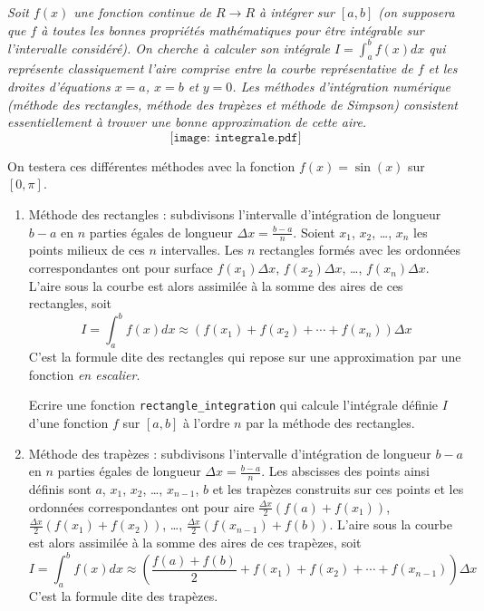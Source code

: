 \begin{td}\label{td:integration}
\em
Soit $f(x)$ une fonction continue de $R \rightarrow R$ à intégrer sur $[a,b]$ 
(on supposera que $f$ à toutes les bonnes propriétés mathématiques pour être
intégrable sur l'intervalle considéré). On cherche à calculer son intégrale
$\displaystyle I = \int_a^b f(x)dx$ qui représente classiquement l'aire
comprise entre la courbe représentative de $f$ et les droites d'équations 
$x=a$, $x=b$ et $y=0$. Les méthodes d'intégration numérique (méthode des rectangles, 
méthode des trapèzes et méthode de Simpson) consistent 
essentiellement à trouver une bonne approximation de cette aire.
$$\texttt{[image: integrale.pdf]}$$

On testera ces différentes méthodes avec la fonction $f(x) = \sin(x)$ sur $[0,\pi]$.
\begin{enumerate}
\item Méthode des rectangles : subdivisons l'intervalle d'intégration de
	longueur $b-a$ en $n$ parties égales de longueur 
	$\displaystyle\Delta x = \frac{b-a}{n}$. Soient $x_1$, $x_2$, \ldots,
	$x_n$ les points milieux de ces $n$ intervalles. Les $n$ rectangles
	formés avec les ordonnées correspondantes ont pour surface $f(x_1)\Delta
	x$, $f(x_2)\Delta x$, \ldots, $f(x_n)\Delta x$. L'aire sous la courbe 
	est alors assimilée à la somme des aires de ces rectangles, soit 
	$$\displaystyle I = \int_a^b f(x)dx \approx
	\left(f(x_1)+f(x_2)+\cdots+f(x_n)\right)\Delta x$$ 
	C'est la formule dite
	des rectangles qui repose sur une approximation par une fonction {\em en
	escalier}.
	
	Ecrire une fonction {\tt rectangle\_integration} qui calcule l'intégrale définie $I$ d'une fonction 
	$f$ sur $[a,b]$ à l'ordre $n$ par la méthode des rectangles.
	
\item Méthode des trapèzes : subdivisons l'intervalle d'intégration de
	longueur $b-a$ en $n$ parties égales de longueur 
	$\displaystyle\Delta x = \frac{b-a}{n}$. Les abscisses des points ainsi
	définis sont
	$a$, $x_1$, $x_2$, \ldots, $x_{n-1}$, $b$ et les trapèzes construits sur ces
	points et les ordonnées correspondantes ont pour aire 
	$\displaystyle \frac{\Delta x}{2}\left(f(a) + f(x_1)\right)$,
	$\displaystyle \frac{\Delta x}{2}\left(f(x_1) + f(x_2)\right)$,
	\ldots,
	$\displaystyle \frac{\Delta x}{2}\left(f(x_{n-1}) + f(b)\right)$.
	L'aire sous la courbe est alors assimilée à la somme des aires de ces 
	trapèzes, soit
	$$\displaystyle I = \int_a^b f(x)dx \approx
	\left(\frac{f(a)+f(b)}{2} + f(x_1) + f(x_2) + \cdots + f(x_{n-1})\right)
	\Delta x$$
	C'est la formule dite des trapèzes.
	

\end{enumerate}
\end{td}
